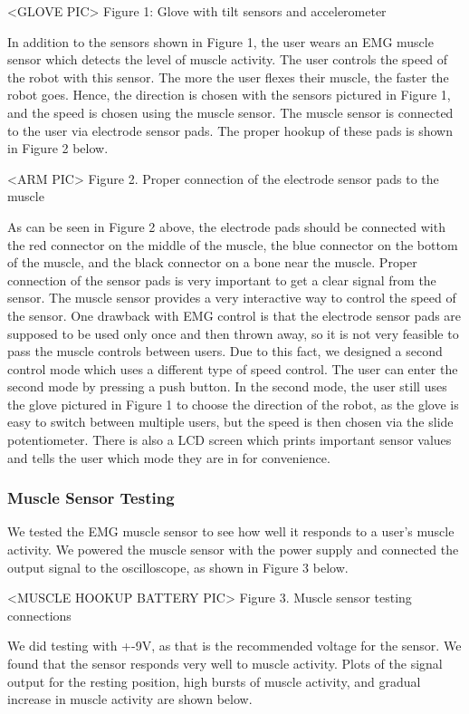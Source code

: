 \documentclass[12pt,scrartcl,titlepage]{article}
\begin{document}
  <GLOVE PIC> Figure 1: Glove with tilt sensors and accelerometer

  In addition to the sensors shown in Figure 1, the user wears an EMG muscle sensor which detects the level of muscle activity. The user controls the speed of the robot with this sensor. The more the user flexes their muscle, the faster the robot goes. Hence, the direction is chosen with the sensors pictured in Figure 1, and the speed is chosen using the muscle sensor. The muscle sensor is connected to the user via electrode sensor pads. The proper hookup of these pads is shown in Figure 2 below.

  <ARM PIC> Figure 2. Proper connection of the electrode sensor pads to the muscle

  As can be seen in Figure 2 above, the electrode pads should be connected with the red connector on the middle of the muscle, the blue connector on the bottom of the muscle, and the black connector on a bone near the muscle. Proper connection of the sensor pads is very important to get a clear signal from the sensor. The muscle sensor provides a very interactive way to control the speed of the sensor. One drawback with EMG control is that the electrode sensor pads are supposed to be used only once and then thrown away, so it is not very feasible to pass the muscle controls between users. Due to this fact, we designed a second control mode which uses a different type of speed control. The user can enter the second mode by pressing a push button. In the second mode, the user still uses the glove pictured in Figure 1 to choose the direction of the robot, as the glove is easy to switch between multiple users, but the speed is then chosen via the slide potentiometer. There is also a LCD screen which prints important sensor values and tells the user which mode they are in for convenience.
  
  \subsubsection{Muscle Sensor Testing}

  We tested the EMG muscle sensor to see how well it responds to a user’s muscle activity. We powered the muscle sensor with the power supply and connected the output signal to the oscilloscope, as shown in Figure 3 below.

  <MUSCLE HOOKUP BATTERY PIC> Figure 3. Muscle sensor testing connections

  We did testing with +-9V, as that is the recommended voltage for the sensor. We found that the sensor responds very well to muscle activity. Plots of the signal output for the resting position, high bursts of muscle activity, and gradual increase in muscle activity are shown below.
\end{document}
